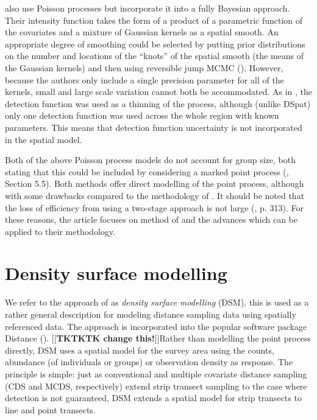 \documentclass[a4paper,12pt]{article}
\begin{document}
\cite{Niemi:2010kx} also use Poisson processes but incorporate it into a fully Bayesian approach. Their intensity function takes the form of a product of a parametric function of the covariates and a mixture of Gaussian kernels as a spatial smooth. An appropriate degree of smoothing could be selected by putting prior distributions on the number and locations of the ``knots'' of the spatial smooth (the means of the Gaussian kernels) and then using reversible jump MCMC (\cite{GREEN:1995dg}). However, because the authors only include a single precision parameter for all of the kernels, small and large scale variation cannot both be accommodated. As in \cite{Johnson:2010gf}, the detection function was used as a thinning of the process, although (unlike DSpat) only one detection function was used across the whole region with known parameters. This means that detection function uncertainty is not incorporated in the spatial model.

Both of the above Poisson process models do not account for group size, both stating that this could be included by considering a marked point process (\cite{cox1980point}, Section 5.5). Both methods offer direct modelling of the point process, although with some drawbacks compared to the methodology of \cite{Hedley:2004et}. It should be noted that the loss of efficiency from using a two-stage approach is not large (\cite{Buckland:2004ts}, p. 313). For these reasons, the article focuses on method of \cite{Hedley:2004et} and the advances which can be applied to their methodology.

\section*{Density surface modelling}
\label{s:dsm}

We refer to the approach of \cite{Hedley:2004et} as \textit{density surface modelling} (DSM), this is used as a rather general description for modeling distance sampling data using spatially referenced data. The approach is incorporated into the popular software package Distance (\cite{Thomas:2010cf}). [[\textbf{TKTKTK change this!}]]Rather than modelling the point process directly, DSM  uses a spatial model for the survey area using the counts, abundance (of individuals or groups) or observation density as response. The principle is simple: just as conventional and multiple covariate distance sampling (CDS and MCDS, respectively) extend strip transect sampling to the case where detection is not guaranteed, DSM extends a spatial model for strip transects to line and point transects.
\end{document}
